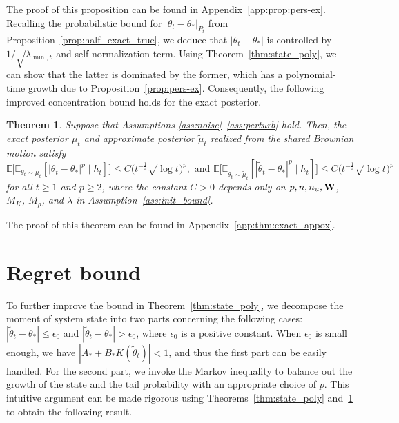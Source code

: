 \documentclass[11pt]{article}
\theoremstyle{plain}
\newtheorem{thm}{Theorem}[section]
\theoremstyle{definition}
\theoremstyle{remark}
\begin{document}
The proof of this proposition can be found in Appendix~\ref{app:prop:pers-ex}.
Recalling the probabilistic bound for $|\theta_t - \theta_*|_{P_t}$ from Proposition~\ref{prop:half_exact_true}, 
we deduce that 
$|\theta_t - \theta_* |$ is controlled by  $1/\sqrt{\lambda_{\min,t}}$ and self-normalization term.
Using Theorem~\ref{thm:state_poly}, we can show that the latter is dominated by the former, which has a polynomial-time growth due to Proposition~\ref{prop:pers-ex}. 
Consequently, the following improved concentration bound holds for the exact posterior.

\begin{thm}\label{thm:exact_appox}
Suppose that Assumptions \ref{ass:noise}--\ref{ass:perturb} hold. Then, the exact posterior $\mu_{t}$ and approximate posterior $\tilde \mu_t$ realized from the shared Brownian motion satisfy
\[
\mathbb{E}\big [\mathbb{E}_{\theta_t \sim \mu_{t}}[|\theta_t-\theta_*|^p \mid h_{t}] \big ] \leq C\Big(t^{-\frac{1}{4}}\sqrt{\log t}\Big)^p, \mbox{ and }
\mathbb{E}\big[\mathbb{E}_{\tilde{\theta}_t \sim \tilde{\mu}_t}[| \tilde{\theta}_t - \theta_* |^p \mid h_{t} ]\big] \leq C\Big(t^{-\frac{1}{4}}\sqrt{\log t}\Big)^p
\] 
for all $t\geq 1$ and $p\geq 2$, where  the constant $C > 0$ depends only on $p, n, n_u, \bold{W}$, $M_K$, $M_\rho$, and $\lambda$  in Assumption~\ref{ass:init_bound}.
\end{thm}

The proof of this theorem can be found in Appendix~\ref{app:thm:exact_appox}.



\section{Regret bound} \label{sec:regret}

To further  improve the bound in Theorem~\ref{thm:state_poly}, we decompose the  moment of system state into two parts concerning the following cases: $|\tilde \theta_t-\theta_*|\leq \epsilon_0$ and $|\tilde \theta_t-\theta_*| > \epsilon_0$, where $\epsilon_0$ is a positive constant. 
When $\epsilon_0$ is small enough, 
we have $|A_*+B_*K(\tilde \theta_t)|<1$, and thus the first part can be easily handled. 
For the second part, we invoke the Markov inequality to balance out the growth of the state and the tail probability with an appropriate choice of $p$. 
This intuitive argument can be made rigorous using Theorems~\ref{thm:state_poly} and~\ref{thm:exact_appox} to obtain the following result. 
\end{document}
